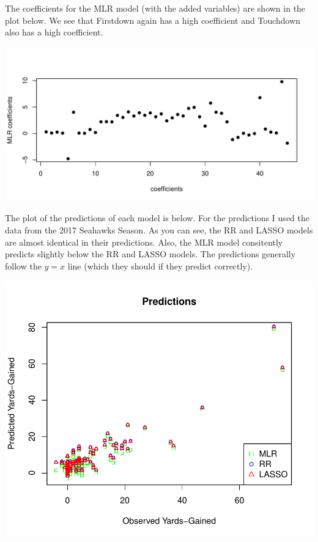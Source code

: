 \documentclass{article}
\begin{document}
\newpage

The coefficients for the MLR model (with the added variables) are shown in the plot below. We see that Firstdown again has a high coefficient and Touchdown also has a high coefficient. 

\includegraphics{project4-010}


The plot of the predictions of each model is below. For the predictions I used the data from the 2017 Seahawks Season. As you can see, the RR and LASSO models are almost identical in their predictions. Also, the MLR model consitently predicts slightly below the RR and LASSO models. The predictions generally follow the $y=x$ line (which they should if they predict correctly). 

\includegraphics{project4-011}
\end{document}
